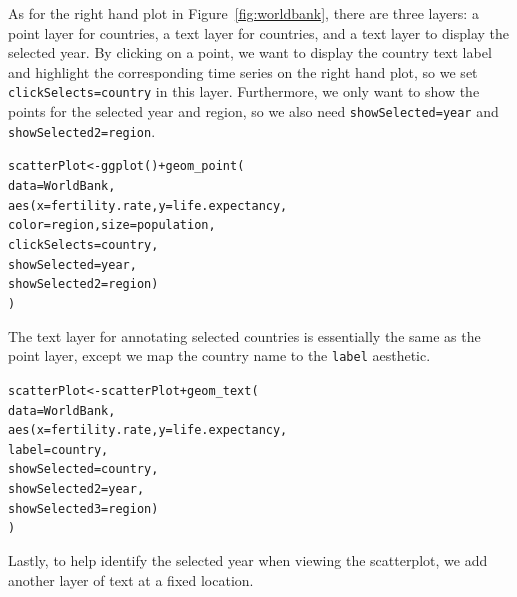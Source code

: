 \documentclass[journal]{vgtc}\usepackage[]{graphicx}\usepackage[]{color}
\makeatletter
\newcommand{\hlopt}[1]{\textcolor[rgb]{0,0,0}{#1}}%
\newcommand{\hlstd}[1]{\textcolor[rgb]{0,0,0}{#1}}%
\newcommand{\hlkwb}[1]{\textcolor[rgb]{0,0,0}{#1}}%
\newcommand{\hlkwc}[1]{\textcolor[rgb]{0,0,1}{#1}}%
\newcommand{\hlkwd}[1]{\textcolor[rgb]{0,0,0}{#1}}%
\newenvironment{kframe}{%
 \def\at@end@of@kframe{}%
 \ifinner\ifhmode%
  \def\at@end@of@kframe{\end{minipage}}%
  \begin{minipage}{\columnwidth}%
 \fi\fi%
 \def\FrameCommand##1{\hskip\@totalleftmargin \hskip-\fboxsep
 \colorbox{shadecolor}{##1}\hskip-\fboxsep
     \hskip-\linewidth \hskip-\@totalleftmargin \hskip\columnwidth}%
 \MakeFramed {\advance\hsize-\width
   \@totalleftmargin\z@ \linewidth\hsize
   \@setminipage}}%
 {\par\unskip\endMakeFramed%
 \at@end@of@kframe}
\newenvironment{knitrout}{}{} %
\makeatother
\begin{document}
As for the right hand plot in Figure~\ref{fig:worldbank}, there are 
three layers: a point layer for countries, a text layer for countries, 
and a text layer to display the selected year. By clicking on a point,
we want to display the country text label and highlight the corresponding
time series on the right hand plot, so we set \texttt{clickSelects=country}
in this layer. Furthermore, we only want to show the points for the 
selected year and region, so we also need \texttt{showSelected=year} and 
\texttt{showSelected2=region}.

\begin{knitrout}
\color{fgcolor}\begin{kframe}
\begin{alltt}
\hlstd{scatterPlot} \hlkwb{<-} \hlkwd{ggplot}\hlstd{()} \hlopt{+} \hlkwd{geom_point}\hlstd{(}
  \hlkwc{data} \hlstd{= WorldBank,}
  \hlkwd{aes}\hlstd{(}\hlkwc{x} \hlstd{= fertility.rate,} \hlkwc{y} \hlstd{= life.expectancy,}
      \hlkwc{color} \hlstd{= region,} \hlkwc{size} \hlstd{= population,}
      \hlkwc{clickSelects} \hlstd{= country,}
      \hlkwc{showSelected} \hlstd{= year,}
      \hlkwc{showSelected2} \hlstd{= region)}
\hlstd{)}
\end{alltt}
\end{kframe}
\end{knitrout}

The text layer for annotating selected countries is essentially the same as the
point layer, except we map the country name to the \texttt{label} aesthetic.

\begin{knitrout}
\color{fgcolor}\begin{kframe}
\begin{alltt}
\hlstd{scatterPlot} \hlkwb{<-} \hlstd{scatterPlot} \hlopt{+} \hlkwd{geom_text}\hlstd{(}
  \hlkwc{data} \hlstd{= WorldBank,}
  \hlkwd{aes}\hlstd{(}\hlkwc{x} \hlstd{= fertility.rate,} \hlkwc{y} \hlstd{= life.expectancy,}
      \hlkwc{label} \hlstd{= country,}
      \hlkwc{showSelected} \hlstd{= country,}
      \hlkwc{showSelected2} \hlstd{= year,}
      \hlkwc{showSelected3} \hlstd{= region)}
\hlstd{)}
\end{alltt}
\end{kframe}
\end{knitrout}

Lastly, to help identify the selected year when viewing the scatterplot, 
we add another layer of text at a fixed location.
\end{document}
